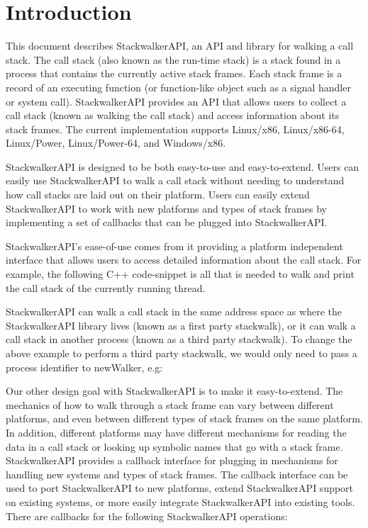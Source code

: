 \section{Introduction}
\label{sec:intro}
This document describes StackwalkerAPI, an API and library for walking a call
stack. The call stack (also known as the run-time stack) is a stack found in a
process that contains the currently active stack frames. Each stack frame is a
record of an executing function (or function-like object such as a signal
handler or system call). StackwalkerAPI provides an API that allows users to
collect a call stack (known as walking the call stack) and access information
about its stack frames. The current implementation supports Linux/x86,
Linux/x86-64, Linux/Power, Linux/Power-64, and Windows/x86.

StackwalkerAPI is designed to be both easy-to-use and easy-to-extend. Users can
easily use StackwalkerAPI to walk a call stack without needing to understand how
call stacks are laid out on their platform. Users can easily extend
StackwalkerAPI to work with new platforms and types of stack frames by
implementing a set of callbacks that can be plugged into StackwalkerAPI.

StackwalkerAPI's ease-of-use comes from it providing a platform independent
interface that allows users to access detailed information about the call stack.
For example, the following C++ code-snippet is all that is needed to walk and
print the call stack of the currently running thread.



StackwalkerAPI can walk a call stack in the same address space as where the
StackwalkerAPI library lives (known as a first party stackwalk), or it can walk
a call stack in another process (known as a third party stackwalk). To change
the above example to perform a third party stackwalk, we would only need to pass
a process identifier to newWalker, e.g:


Our other design goal with StackwalkerAPI is to make it easy-to-extend. The
mechanics of how to walk through a stack frame can vary between different
platforms, and even between different types of stack frames on the same
platform. In addition, different platforms may have different mechanisms for
reading the data in a call stack or looking up symbolic names that go with a
stack frame. StackwalkerAPI provides a callback interface for plugging in
mechanisms for handling new systems and types of stack frames. The callback
interface can be used to port StackwalkerAPI to new platforms, extend
StackwalkerAPI support on existing systems, or more easily integrate
StackwalkerAPI into existing tools. There are callbacks for the following
StackwalkerAPI operations:

